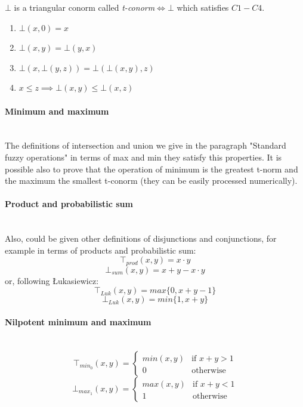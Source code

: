 \documentclass{article}
\begin{document}
\noindent $\bot$ is a triangular conorm called \textit{t-conorm}$\Longleftrightarrow\bot$ which
satisfies $C1-C4$.
\begin{enumerate}
    \item $\bot(x,0)=x$
    \item $\bot(x,y)=\bot(y,x)$
    \item $\bot(x,\bot(y,z))=\bot(\bot(x,y),z)$
    \item $x\leq z \implies\bot(x,y)\leq\bot(x,z)$
\end{enumerate}

\paragraph{Minimum and maximum}\mbox{}\\
The definitions of intersection and union we give in the paragraph "Standard fuzzy operations"
in terms of max and min they satisfy this properties. It is possible also to prove that the
operation of minimum is the greatest t-norm and the maximum the smallest t-conorm (they
can be easily processed numerically).

\paragraph{Product and probabilistic sum}\mbox{}\\
Also, could be given other definitions of disjunctions and conjunctions, for example
in terms of products and probabilistic sum:
$$\top_{prod}(x,y)=x\cdot y$$
$$\bot_{sum}(x,y)=x+y-x\cdot y$$
or, following Łukasiewicz:
$$\top_{Luk}(x,y)=max\{0,x+y-1\}$$
$$\bot_{Luk}(x,y)=min\{1,x+y\}$$

\paragraph{Nilpotent minimum and maximum}\mbox{}\\
\[
    \top_{min_0}(x,y)=
    \begin{cases}
        min(x,y) & \text{if } x+y>1 \\
        0        & \text{otherwise}
    \end{cases}
\]
\[
    \bot_{max_1}(x,y)=
    \begin{cases}
        max(x,y) & \text{if }x+y<1  \\
        1        & \text{otherwise}
    \end{cases}
\]
\end{document}
